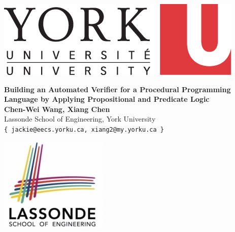 \documentclass[a0,landscape]{a0poster}
\begin{document}
\begin{minipage}[b]{0.2\linewidth}
\centering
\includegraphics[width=.75\linewidth]{logos/yorku.png}  
\end{minipage}
%
\begin{minipage}[b]{0.6\linewidth}
\centering
\veryHuge \color{Blue} \textbf{Building an Automated Verifier for a Procedural Programming Language by Applying Propositional and Predicate Logic} \color{Black}  \\ [1cm]
\huge \textbf{Chen-Wei Wang, Xiang Chen} \\ 
\huge Lassonde School of Engineering, York University \\
\LARGE \texttt{\{~jackie@eecs.yorku.ca, xiang2@my.yorku.ca~\}}
\end{minipage}
%
\begin{minipage}[b]{0.2\linewidth}
\centering
\includegraphics[width=.45\linewidth]{logos/lassonde.jpeg}
\end{minipage}

\vspace{1cm} 
\end{document}
